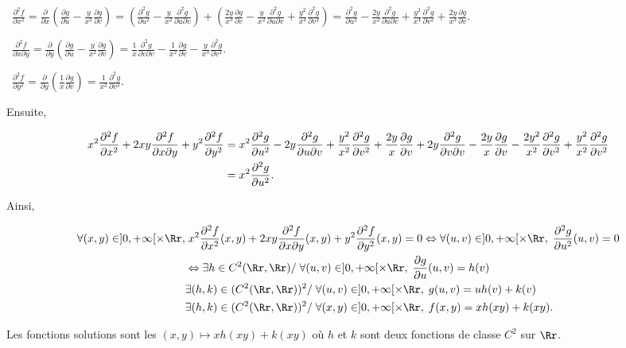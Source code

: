 {\begin{enumerate}
{\textbullet~$ \frac{\partial^2f}{\partial x^2}= \frac{\partial}{\partial x}\left( \frac{\partial g}{\partial u}- \frac{y}{x^2} \frac{\partial g}{\partial v}\right)=\left( \frac{\partial^2g}{\partial u^2}- \frac{y}{x^2} \frac{\partial^2g}{\partial u\partial v}\right)+\left( \frac{2y}{x^3} \frac{\partial g}{\partial v}- \frac{y}{x^2} \frac{\partial^2g}{\partial u\partial v}+ \frac{y^2}{x^4} \frac{\partial^2g}{\partial v^2}\right)= \frac{\partial^2g}{\partial u^2}- \frac{2y}{x^2} \frac{\partial^2g}{\partial u\partial v}+ \frac{y^2}{x^4} \frac{\partial^2g}{\partial v^2}+ \frac{2y}{x^3} \frac{\partial g}{\partial v}$.

\textbullet~$ \frac{\partial^2f}{\partial x\partial y}= \frac{\partial}{\partial y}\left( \frac{\partial g}{\partial u}- \frac{y}{x^2} \frac{\partial g}{\partial v}\right)= \frac{1}{x} \frac{\partial^2g}{\partial v\partial  v}- \frac{1}{x^2} \frac{\partial g}{\partial v}- \frac{y}{x^3} \frac{\partial^2g}{\partial v^2}$.

\textbullet~$ \frac{\partial^2f}{\partial y^2}= \frac{\partial}{\partial y}\left( \frac{1}{x} \frac{\partial g}{\partial v}\right)= \frac{1}{x^2} \frac{\partial^2g}{\partial v^2}$.

Ensuite,

\begin{align*}\ensuremath
x^2 \frac{\partial^2f}{\partial x^2}+2xy \frac{\partial^2f}{\partial x\partial y}+y^2 \frac{\partial^2f}{\partial y^2}&=x^2 \frac{\partial^2g}{\partial u^2}-2y \frac{\partial^2g}{\partial u\partial v}+ \frac{y^2}{x^2} \frac{\partial^2g}{\partial v^2}+ \frac{2y}{x} \frac{\partial g}{\partial v}+2y \frac{\partial^2g}{\partial v\partial  v}- \frac{2y}{x} \frac{\partial g}{\partial v}- \frac{2y^2}{x^2} \frac{\partial^2g}{\partial v^2}+ \frac{y^2}{x^2} \frac{\partial^2g}{\partial v^2}\\
 &=x^2 \frac{\partial^2g}{\partial u^2}.
\end{align*}

Ainsi,

\begin{align*}\ensuremath
\forall(x,y)\in]0,+\infty[\times\Rr,&\;x^2 \frac{\partial^2f}{\partial x^2}(x,y)+2xy \frac{\partial^2f}{\partial x\partial y}(x,y)+y^2 \frac{\partial^2f}{\partial y^2}(x,y)=0\Leftrightarrow\forall(u,v)\in]0,+\infty[\times\Rr,\; \frac{\partial^2g}{\partial u^2}(u,v)=0\\
 &\Leftrightarrow\exists h\in C^2(\Rr,\Rr)/\;\forall(u,v)\in]0,+\infty[\times\Rr,\; \frac{\partial g}{\partial u}(u,v)=h(v)\\
  &\exists(h,k)\in(C^2(\Rr,\Rr))^2/\;\forall(u,v)\in]0,+\infty[\times\Rr,\;g(u,v)=uh(v)+k(v)\\
  &\exists(h,k)\in(C^2(\Rr,\Rr))^2/\;\forall(x,y)\in]0,+\infty[\times\Rr,\;f(x,y)=xh(xy)+k(xy).
\end{align*}

Les fonctions solutions sont les $(x,y)\mapsto xh(xy)+k(xy)$ où $h$ et $k$ sont deux fonctions de classe $C^2$ sur $\Rr$.}
\end{enumerate}
}
